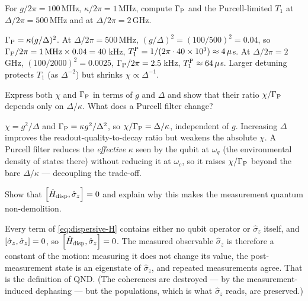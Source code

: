 \begin{exercise}
For $g/2\pi=100\,$MHz, $\kappa/2\pi=1\,$MHz, compute
$\Gamma_{\rm P}$ and the Purcell-limited $T_1$ at $\Delta/2\pi=500\,$MHz
and at $\Delta/2\pi=2\,$GHz.
\begin{solution}
$\Gamma_{\rm P}=\kappa(g/\Delta)^2$. At $\Delta/2\pi=500\,$MHz,
$(g/\Delta)^2=(100/500)^2=0.04$, so
$\Gamma_{\rm P}/2\pi=1\,\text{MHz}\times0.04=40\,$kHz,
$T_1^{\rm P}=1/(2\pi\cdot40\times10^3)\approx4\,\mu$s. At
$\Delta/2\pi=2\,$GHz, $(100/2000)^2=0.0025$,
$\Gamma_{\rm P}/2\pi=2.5\,$kHz, $T_1^{\rm P}\approx64\,\mu$s. Larger
detuning protects $T_1$ (as $\Delta^{-2}$) but shrinks $\chi\propto\Delta^{-1}$.
\end{solution}
\end{exercise}

\begin{exercise}
Express both $\chi$ and $\Gamma_{\rm P}$ in terms of $g$ and
$\Delta$ and show that their ratio $\chi/\Gamma_{\rm P}$ depends only
on $\Delta/\kappa$. What does a Purcell filter change?
\begin{solution}
$\chi=g^2/\Delta$ and $\Gamma_{\rm P}=\kappa g^2/\Delta^2$, so
$\chi/\Gamma_{\rm P}=\Delta/\kappa$, independent of $g$. Increasing
$\Delta$ improves the readout-quality-to-decay ratio but weakens the
absolute $\chi$. A Purcell filter reduces the \emph{effective}
$\kappa$ seen by the qubit at $\omega_q$ (the environmental density
of states there) without reducing it at $\omega_c$, so it raises
$\chi/\Gamma_{\rm P}$ beyond the bare $\Delta/\kappa$ --- decoupling
the trade-off.
\end{solution}
\end{exercise}

\begin{exercise}
Show that $\comm{\op H_{\rm disp}}{\hat\sigma_z}=0$ and explain why
this makes the measurement quantum non-demolition.
\begin{solution}
Every term of \cref{eq:dispersive-H} contains either no qubit
operator or $\hat\sigma_z$ itself, and $\comm{\hat\sigma_z}{\hat\sigma_z}=0$,
so $\comm{\op H_{\rm disp}}{\hat\sigma_z}=0$. The measured observable
$\hat\sigma_z$ is therefore a constant of the motion: measuring it
does not change its value, the post-measurement state is an
eigenstate of $\hat\sigma_z$, and repeated measurements agree. That
is the definition of QND. (The coherences are destroyed --- by the
measurement-induced dephasing --- but the populations, which is what
$\hat\sigma_z$ reads, are preserved.)
\end{solution}
\end{exercise}

